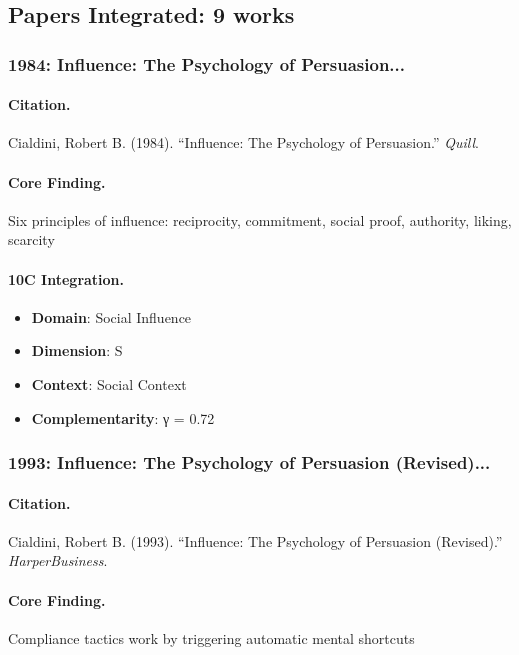 \subsection{Papers Integrated: 9 works}

\subsubsection{1984: Influence: The Psychology of Persuasion...}

\paragraph{Citation.}
Cialdini, Robert B. (1984). ``Influence: The Psychology of Persuasion.''
\textit{Quill}.

\paragraph{Core Finding.}
Six principles of influence: reciprocity, commitment, social proof, authority, liking, scarcity

\paragraph{10C Integration.}
\begin{itemize}[nosep]
  \item \textbf{Domain}: Social Influence
  \item \textbf{Dimension}: S
  \item \textbf{Context}: Social Context
  \item \textbf{Complementarity}: γ = 0.72
\end{itemize}

\subsubsection{1993: Influence: The Psychology of Persuasion (Revised)...}

\paragraph{Citation.}
Cialdini, Robert B. (1993). ``Influence: The Psychology of Persuasion (Revised).''
\textit{HarperBusiness}.

\paragraph{Core Finding.}
Compliance tactics work by triggering automatic mental shortcuts

